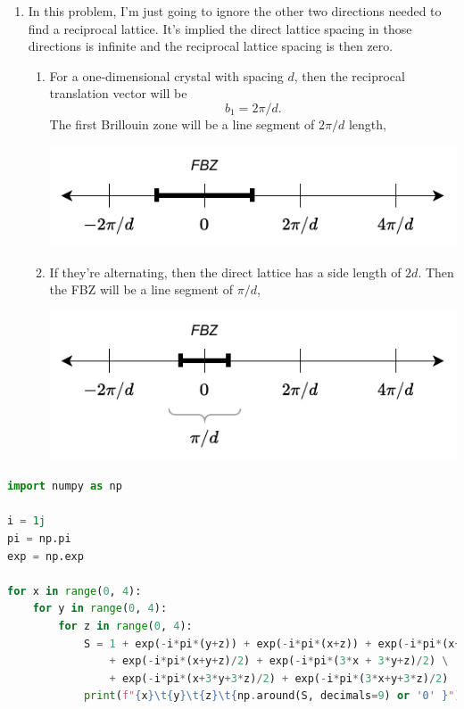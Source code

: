 \documentclass{homework}
\begin{document}
\begin{enumerate}
		\item In this problem, I'm just going to ignore the other two directions needed to find a reciprocal lattice. It's implied the direct lattice spacing in those directions is infinite and the reciprocal lattice spacing is then zero.
		 \begin{enumerate}
			\item For a one-dimensional crystal with spacing $d$, then the reciprocal translation vector will be $$b_1 = 2 \pi / d.$$ The first Brillouin zone will be a line segment of $2\pi/d$ length,
			\begin{center}
				\includegraphics{fbz.pdf}
			\end{center}
			
			\item If they're alternating, then the direct lattice has a side length of $2d$. Then the FBZ will be a line segment of $\pi/d$,
			\begin{center}
				\includegraphics{fbz2.pdf}
			\end{center}
		\end{enumerate}
	\end{enumerate}

	\pagebreak
	\begin{lstlisting}[language=python,title={Python code to determine $v_1, v_2, v_3 \mod 4$ values which produce zeros and maxima.}]
import numpy as np

i = 1j
pi = np.pi
exp = np.exp

for x in range(0, 4):
	for y in range(0, 4):
		for z in range(0, 4):
			S = 1 + exp(-i*pi*(y+z)) + exp(-i*pi*(x+z)) + exp(-i*pi*(x+y)) \ 
				+ exp(-i*pi*(x+y+z)/2) + exp(-i*pi*(3*x + 3*y+z)/2) \
				+ exp(-i*pi*(x+3*y+3*z)/2) + exp(-i*pi*(3*x+y+3*z)/2)
			print(f"{x}\t{y}\t{z}\t{np.around(S, decimals=9) or '0' }")
	\end{lstlisting}
\end{document}
